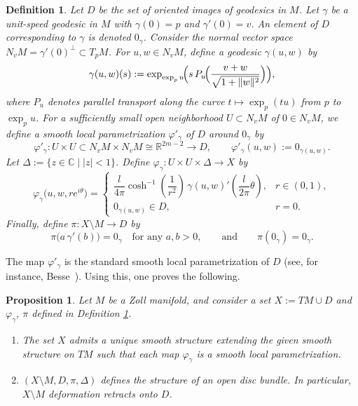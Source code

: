 \documentclass[a4paper, 12pt]{article}
\newcommand{\bC}{\mathbb{C}}
\newcommand{\bR}{\mathbb{R}}
\newtheorem{prop}[thm]{Proposition}
\newtheorem{defn}[thm]{Definition}
\begin{document}
\begin{defn}\label{chart}
Let $D$ be the set of oriented images of geodesics in $M$. Let $\gamma$ be a unit-speed geodesic in $M$ with $\gamma(0)=p$ and $\gamma'(0)=v$. An element of $D$ corresponding to $\gamma$ is denoted $0_\gamma$.
Consider the normal vector space $N_vM=\gamma'(0)^\perp \subset T_pM$.
For $u,w\in N_v M$, define a geodesic $\gamma(u,w)$ by
\[
\gamma(u,w)(s):=\exp_{\exp_p u}\!\Bigl( s\, P_u\!\Bigl(\frac{v+w}{\sqrt{1+\|w\|^2}}\Bigr)\Bigr),
\]
where $P_u$ denotes parallel transport along the curve $t\mapsto \exp_p(tu)$ from $p$ to $\exp_p u$. For a sufficiently small open neighborhood $U\subset N_v M$ of $0\in N_v M$, we define a smooth local parametrization $\varphi'_\gamma$ of $D$ around $0_\gamma$ by
\[
\varphi'_\gamma \colon U\times U \subset N_vM\times N_vM \cong \bR^{2m-2} \longrightarrow D,
\qquad
\varphi'_\gamma(u,w):=0_{\gamma(u,w)}.
\]
Let $\Delta:=\{z\in \bC \mid |z|<1\}$. Define $\varphi_\gamma \colon U\times U\times \Delta \longrightarrow X$ by
\[
\varphi_\gamma\!\bigl(u,w,re^{i\theta}\bigr)=
\begin{cases}
\dfrac{l}{4\pi}\cosh^{-1}\left(\dfrac{1}{r^2}\right)\,\gamma(u,w)'\!\left(\dfrac{l}{2\pi}\theta\right), & r\in (0,1),\\[0.4em]
0_{\gamma(u,w)}\in D, & r=0.
\end{cases}
\]
Finally, define $\pi \colon X\setminus M \to D$ by
\[
\pi\bigl(a\,\gamma'(b)\bigr)=0_\gamma \quad \text{for any } a,b>0,
\qquad\text{and}\qquad
\pi(0_\gamma)=0_\gamma.
\]
\end{defn}

The map $\varphi'_\gamma$ is the standard smooth local parametrization of $D$ (see, for instance, Besse~\cite[Chapter 2, 2.14]{B12}). Using this, one proves the following.

\begin{prop}\label{bundle}
Let $M$ be a Zoll manifold, and consider a set $X := TM \cup D$ and $\varphi_\gamma$, $\pi$ defined in Definition \ref{chart}.
\begin{enumerate}
\item The set $X$ admits a unique smooth structure extending the given smooth structure on $TM$ such that each map $\varphi_\gamma$ is a smooth local parametrization.
\item $(X\setminus M, D, \pi, \Delta)$ defines the structure of an open disc bundle. In particular, $X\setminus M$ deformation retracts onto $D$.
\end{enumerate}
\end{prop}
\end{document}
